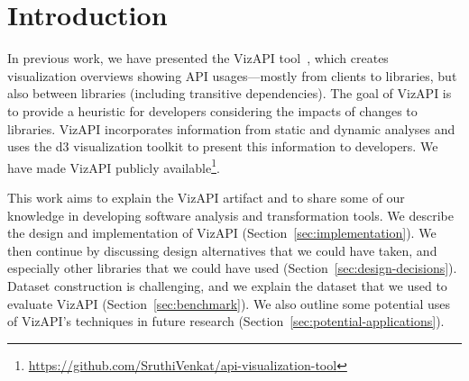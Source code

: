 \section{Introduction}
\label{sec:introduction}

In previous work, we have presented the VizAPI tool~\cite{venkatanarayanan22:_vizap,venkatanarayanan22:_study_lever_api_usage_patter}, which creates visualization overviews showing API usages---mostly from clients to libraries, but also between libraries (including transitive dependencies). The goal of VizAPI is to provide a heuristic for developers considering the impacts of changes to libraries. VizAPI incorporates information from static and dynamic analyses and uses the d3 visualization toolkit to present this information to developers. We have made VizAPI publicly available\footnote{\url{https://github.com/SruthiVenkat/api-visualization-tool}}.

This work aims to explain the VizAPI artifact and to share some of our knowledge in developing software analysis and transformation tools. We describe the design and implementation of VizAPI (Section~\ref{sec:implementation}). We then continue by discussing design alternatives that we could have taken, and especially other libraries that we could have used (Section~\ref{sec:design-decisions}). Dataset construction is challenging, and we explain the dataset that we used to evaluate VizAPI (Section~\ref{sec:benchmark}). We also outline some potential uses of VizAPI's techniques in future research (Section~\ref{sec:potential-applications}).



